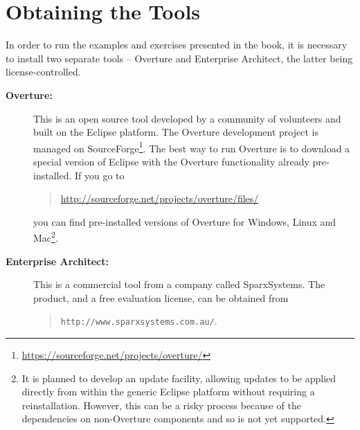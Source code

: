 \section{Obtaining the Tools}\label{sec:install}

In order to run the examples and exercises presented in the book, it
is necessary to install two separate tools -- Overture and Enterprise
Architect, the latter being license-controlled. 
\begin{description}
\item[\textbf{Overture:}] This is an open source tool developed by a
  community of volunteers and built on the Eclipse platform. The
  Overture development project is managed on
  SourceForge\footnote{\url{https://sourceforge.net/projects/overture/}}.
The best way to run Overture is to download a special version of
  Eclipse with the Overture functionality already
  pre-installed. If you go to
  \begin{quote}
  \url{http://sourceforge.net/projects/overture/files/}
  \end{quote}
  \noindent you can find pre-installed versions of Overture for
  Windows, Linux and Mac\footnote{It is planned to develop an update facility,
  allowing updates to be applied directly from within the generic
  Eclipse platform without requiring a reinstallation. However, this can be a
  risky process because of the dependencies on non-Overture components
  and so is not yet supported.}.

\item[\textbf{Enterprise Architect:}] This is a commercial tool from a
  company called SparxSystems. The product, and a free evaluation license, can be
  obtained from 
\begin{quote}
\texttt{http://www.sparxsystems\-.com\-.au/}.
\end{quote}

\end{description}

